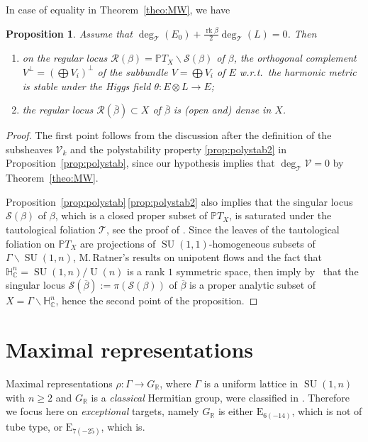 \documentclass[JEP,XML,SOM,Unicode,NoFloatCountersInSection]{cedram}
\let\mathcal\mathscr
\newcommand{\citestar}[3]{\cite[#3]{#1}}
\theoremstyle{plain}
\newtheorem{prop}[theo]{Proposition}
\theoremstyle{definition}
\let\ov\overline
\DeclareMathOperator{\rk}{rk}
\DeclareMathOperator{\SU}{SU}
\DeclareMathOperator{\rU}{U}
\newcommand{\cR}{\mathcal{R}}
\newcommand{\cS}{\mathcal{S}}
\newcommand{\cT}{\mathcal{T}}
\newcommand{\cV}{\mathcal{V}}
\newcommand{\bR}{\mathbb{R}}
\newcommand{\HC}{{\mathbb{H}^n_\mathbb{C}}}
\newcommand{\PTX}{{\mathbb{P}T_X}}
\newcommand{\ovb}{\ov{\beta}}
\begin{document}
In case of equality in Theorem~\ref{theo:MW}, we have

\begin{prop}\label{prop:equal}
Assume that $\deg_\cT(E_0)+ \frac{\rk\beta}{2}\deg_\cT(L) =0$. Then
\begin{enumerate}
\item on the regular locus $\cR(\beta)=\PTX\backslash\cS(\beta)$ of $\beta$, the orthogonal complement
$V^\perp=(\bigoplus V_i)^\perp$ of the subbundle $V=\bigoplus V_i$ of $E$ w.r.t.\ the harmonic metric is
stable under the Higgs field $\theta:E\otimes L\to E$;
\item the regular locus $\cR(\ovb)\subset X$ of $\ovb$ is (open and) dense in $X$.
\end{enumerate}
\end{prop}

\begin{proof}
The first point follows from the discussion after the definition of the subsheaves $\cV_k$ and the
polystability property \eqref{prop:polystab2} in Proposition~\ref{prop:polystab}, since our hypothesis implies that
$\deg_\cT \cV=0$ by Theorem~\ref{theo:MW}.

Proposition~\ref{prop:polystab}\,\eqref{prop:polystab2} also implies that the singular locus $\cS(\beta)$ of $\beta$, which is a
closed proper subset of $\PTX$, is saturated
under the tautological foliation $\cT$, see the proof of
\citestar{KM}*{Lem.\,4.5}. Since the leaves of the tautological foliation on $\PTX$ are
projections of $\SU(1,1)$-homogeneous subsets of $\Gamma\backslash\SU(1,n)$, M.\,Ratner's
results on unipotent flows and the fact that $\HC=\SU(1,n)/\rU(n)$ is a rank $1$ symmetric
space, then imply by~\citestar{KM}*{Prop.\,3.6} that
the singular locus $\cS(\ovb):=\pi(\cS(\beta))$ of $\ovb$ is a proper analytic subset of $X=\Gamma\backslash\HC$,
hence the second point of the proposition.
\end{proof}

\section{Maximal representations}\label{sec:max}

Maximal representations $\rho:\Gamma\to G_\bR$, where $\Gamma$ is a uniform lattice in $\SU(1,n)$ with
$n\geq 2$ and $G_\bR$ is a \emph{classical} Hermitian group,
were classified in \cite{KM}. Therefore we focus here on \emph{exceptional} targets, namely $G_\bR$ is either
$\mathrm{E}_{6(-14)}$, which is not of tube type, or $\mathrm{E}_{7(-25)}$, which is.
\end{document}
